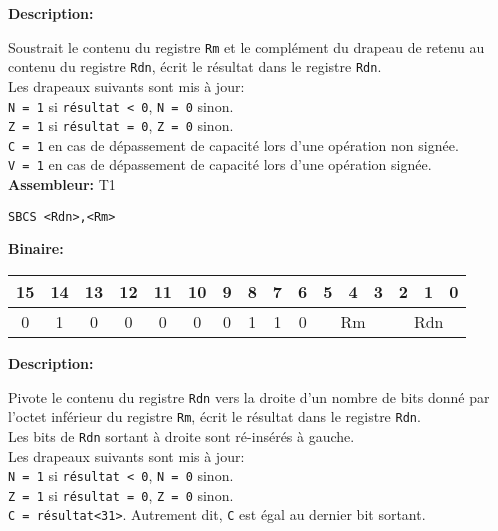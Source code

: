 
\textbf{Description: }

Soustrait le contenu du registre \texttt{Rm} et le complément du drapeau de retenu au contenu du registre \texttt{Rdn}, écrit le résultat dans le registre \texttt{Rdn}.\\
Les drapeaux suivants sont mis à jour:\\
\texttt{N = 1} si \texttt{résultat < 0}, \texttt{N = 0} sinon.\\
\texttt{Z = 1} si \texttt{résultat = 0}, \texttt{Z = 0} sinon.\\
\texttt{C = 1} en cas de dépassement de capacité lors d'une opération non signée.\\
\texttt{V = 1} en cas de dépassement de capacité lors d'une opération signée.\\

\textbf{Assembleur:} T1

\begin{lstlisting}
SBCS <Rdn>,<Rm>
\end{lstlisting}

\textbf{Binaire:}\\

\begin{tabular}{| c c c c c c c c c c c c c c c c |}
\hline
15 & 14 & 13 & 12 & 11 & 10 & \multicolumn{1}{|c}{9} & 8 & 7 & 6 & \multicolumn{1}{|c}{5} & 4 & 3 & \multicolumn{1}{|c}{2} & 1 & 0 \\
\hline
0 & 1 & 0 & 0 & 0 & 0 & \multicolumn{1}{|c}{0} & 1 & 1 & 0 & \multicolumn{3}{|c}{Rm} & \multicolumn{3}{|c|}{Rdn} \\
\hline
\end{tabular}




\textbf{Description: }

Pivote le contenu du registre \texttt{Rdn} vers la droite d'un nombre de bits donné par l'octet inférieur du registre \texttt{Rm}, écrit le résultat dans le registre \texttt{Rdn}.\\
Les bits de \texttt{Rdn} sortant à droite sont ré-insérés à gauche.\\
Les drapeaux suivants sont mis à jour:\\
\texttt{N = 1} si \texttt{résultat < 0}, \texttt{N = 0} sinon.\\
\texttt{Z = 1} si \texttt{résultat = 0}, \texttt{Z = 0} sinon.\\
\texttt{C = résultat<31>}. Autrement dit, \texttt{C} est égal au dernier bit sortant.\\

